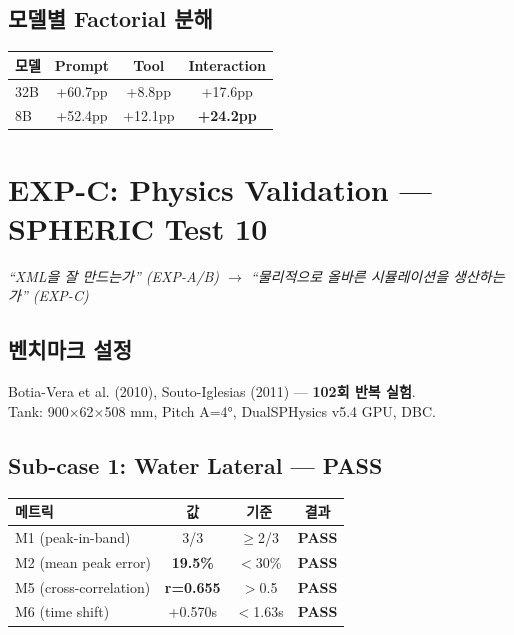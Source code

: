 \documentclass[10pt,a4paper]{article}
\begin{document}
\subsection{모델별 Factorial 분해}

\begin{center}
\renewcommand{\arraystretch}{1.1}
\begin{tabular}{lccc}
\toprule
모델 & Prompt & Tool & Interaction \\
\midrule
32B & +60.7pp & +8.8pp & +17.6pp \\
8B & +52.4pp & +12.1pp & \textbf{+24.2pp} \\
\bottomrule
\end{tabular}
\end{center}

\section{EXP-C: Physics Validation — SPHERIC Test 10}

\textit{``XML을 잘 만드는가'' (EXP-A/B) $\rightarrow$ ``물리적으로 올바른 시뮬레이션을 생산하는가'' (EXP-C)}

\subsection{벤치마크 설정}

Botia-Vera et al. (2010), Souto-Iglesias (2011) — \textbf{102회 반복 실험}.\\
Tank: 900$\times$62$\times$508 mm, Pitch A=4°, DualSPHysics v5.4 GPU, DBC.

\subsection{Sub-case 1: Water Lateral — \textcolor{pass}{PASS}}

\begin{center}
\renewcommand{\arraystretch}{1.2}
\begin{tabular}{lccc}
\toprule
메트릭 & 값 & 기준 & 결과 \\
\midrule
M1 (peak-in-band) & 3/3 & $\geq$2/3 & \textcolor{pass}{\textbf{PASS}} \\
M2 (mean peak error) & \textbf{19.5\%} & $<$30\% & \textcolor{pass}{\textbf{PASS}} \\
M5 (cross-correlation) & \textbf{r=0.655} & $>$0.5 & \textcolor{pass}{\textbf{PASS}} \\
M6 (time shift) & +0.570s & $<$1.63s & \textcolor{pass}{\textbf{PASS}} \\
\bottomrule
\end{tabular}
\end{center}
\end{document}

